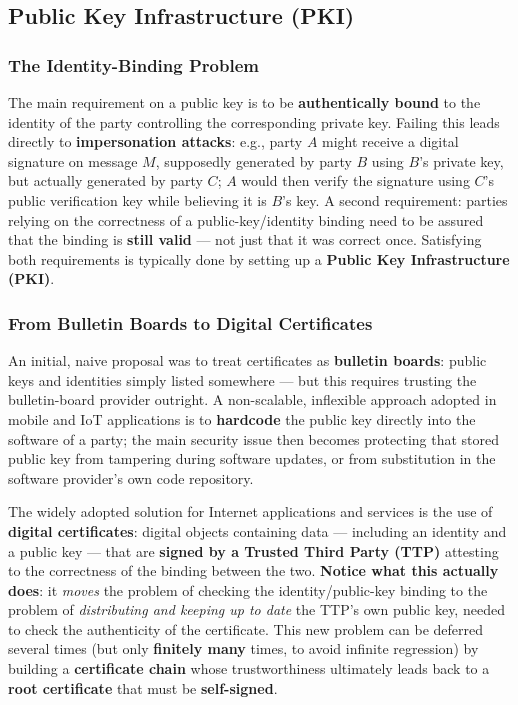 \documentclass[12pt, a4paper]{article}
\begin{document}
\subsection{Public Key Infrastructure (PKI)}
\label{subsec:pki-05}

\subsubsection{The Identity-Binding Problem}
The main requirement on a public key is to be \textbf{authentically bound} to the identity of the party controlling the corresponding private key. Failing this leads directly to \textbf{impersonation attacks}: e.g., party $A$ might receive a digital signature on message $M$, supposedly generated by party $B$ using $B$'s private key, but actually generated by party $C$; $A$ would then verify the signature using $C$'s public verification key while believing it is $B$'s key. A second requirement: parties relying on the correctness of a public-key/identity binding need to be assured that the binding is \textbf{still valid} --- not just that it was correct once. Satisfying both requirements is typically done by setting up a \textbf{Public Key Infrastructure (PKI)}.

\subsubsection{From Bulletin Boards to Digital Certificates}
An initial, naive proposal was to treat certificates as \textbf{bulletin boards}: public keys and identities simply listed somewhere --- but this requires trusting the bulletin-board provider outright. A non-scalable, inflexible approach adopted in mobile and IoT applications is to \textbf{hardcode} the public key directly into the software of a party; the main security issue then becomes protecting that stored public key from tampering during software updates, or from substitution in the software provider's own code repository.

The widely adopted solution for Internet applications and services is the use of \textbf{digital certificates}: digital objects containing data --- including an identity and a public key --- that are \textbf{signed by a Trusted Third Party (TTP)} attesting to the correctness of the binding between the two. \textcolor{blue!50!black}{\textbf{Notice what this actually does}}: it \emph{moves} the problem of checking the identity/public-key binding to the problem of \emph{distributing and keeping up to date} the TTP's own public key, needed to check the authenticity of the certificate. This new problem can be deferred several times (but only \textbf{finitely many} times, to avoid infinite regression) by building a \textbf{certificate chain} whose trustworthiness ultimately leads back to a \textbf{root certificate} that must be \textbf{self-signed}.
\end{document}
